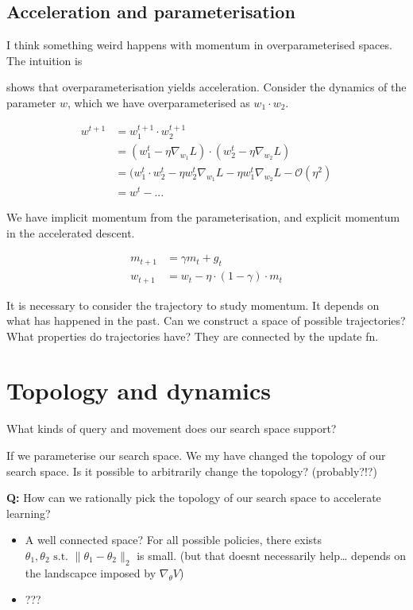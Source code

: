 \subsection{Acceleration and parameterisation}

I think something weird happens with momentum in overparameterised spaces. The intuition is

\cite{Arora2018} shows that overparameterisation yields acceleration. Consider
the dynamics of the parameter $w$, which we have overparameterised as $w_1 \cdot w_2$.

\begin{align}
w^{t+1} &= w_1^{t+1} \cdot w_2^{t+1} \\
&= (w_1^t - \eta \nabla_{w_1} L)\cdot(w_2^t - \eta \nabla_{w_2} L) \\
&= (w_1^t \cdot w_2^t - \eta w_2^t \nabla_{w_1} L - \eta w_1^t \nabla_{w_2} L - \mathcal O(\eta^2) \\
&= w^t - ...
\end{align}

We have implicit momentum from the parameterisation, and explicit momentum in the accelerated descent.


\begin{align}
m_{t+1} &= \gamma m_t + g_t \\
w_{t+1} &= w_t - \eta \cdot (1-\gamma) \cdot m_t
\end{align}

It is necessary to consider the trajectory to study momentum. It depends
on what has happened in the past. Can we construct a space of possible
trajectories? What properties do trajectories have? They are connected
by the update fn.


\section{Topology and dynamics}

What kinds of query and movement does our search space support?

If we parameterise our search space. We my have changed the topology of our search space.
Is it possible to arbitrarily change the topology? (probably?!?)

\textbf{Q:} How can we rationally pick the topology of our search space
to accelerate learning?

\begin{itemize}
\item
  A well connected space? For all possible policies, there exists
  \(\theta_1, \theta_2 \text{ s.t. } \parallel \theta_1- \theta_2\parallel_2\)
  is small. (but that doesnt necessarily help\ldots{} depends on the
  landscapce imposed by \(\nabla_{\theta} V\))
\item
  ???
\end{itemize}

